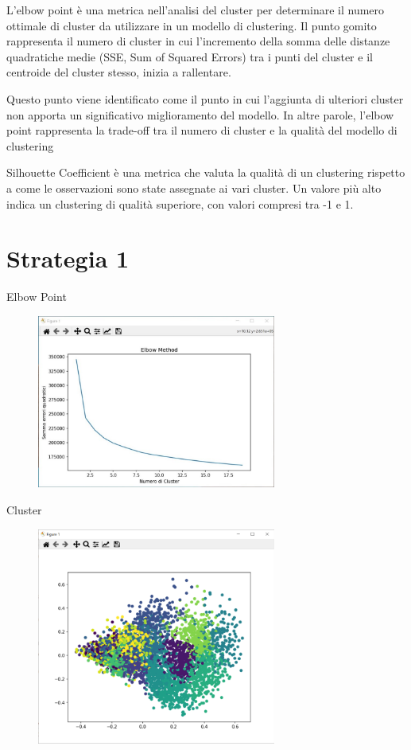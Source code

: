 \documentclass[12pt]{report}
\begin{document}
L'elbow point è una metrica nell'analisi del cluster per determinare il numero ottimale di cluster da utilizzare in un modello di clustering. Il punto gomito rappresenta il numero di cluster in cui l'incremento della somma delle distanze quadratiche medie (SSE, Sum of Squared Errors) tra i punti del cluster e il centroide del cluster stesso, inizia a rallentare. 

Questo punto viene identificato come il punto in cui l'aggiunta di ulteriori cluster non apporta un significativo miglioramento del modello. In altre parole, l'elbow point rappresenta la trade-off tra il numero di cluster e la qualità del modello di clustering

Silhouette Coefficient è una metrica che valuta la qualità di un clustering rispetto a come le osservazioni sono state assegnate ai vari cluster. Un valore più alto indica un clustering di qualità superiore, con valori compresi tra -1 e 1.

\section{Strategia 1}   

Elbow Point

\begin{figure}[H]
        \centering
        {\includegraphics[width=0.7\textwidth]{img/img22.jpg}}
\end{figure}

Cluster

\begin{figure}[H]
        \centering
        {\includegraphics[width=0.7\textwidth]{img/img23.jpg}}
\end{figure}
\end{document}
